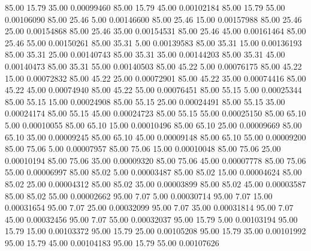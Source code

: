      85.00     15.79     35.00     0.00099460
     85.00     15.79     45.00     0.00102184
     85.00     15.79     55.00     0.00106090
     85.00     25.46      5.00     0.00146600
     85.00     25.46     15.00     0.00157988
     85.00     25.46     25.00     0.00154868
     85.00     25.46     35.00     0.00154531
     85.00     25.46     45.00     0.00161464
     85.00     25.46     55.00     0.00150261
     85.00     35.31      5.00     0.00139583
     85.00     35.31     15.00     0.00136193
     85.00     35.31     25.00     0.00140743
     85.00     35.31     35.00     0.00144203
     85.00     35.31     45.00     0.00140473
     85.00     35.31     55.00     0.00140503
     85.00     45.22      5.00     0.00076175
     85.00     45.22     15.00     0.00072832
     85.00     45.22     25.00     0.00072901
     85.00     45.22     35.00     0.00074416
     85.00     45.22     45.00     0.00074940
     85.00     45.22     55.00     0.00076451
     85.00     55.15      5.00     0.00025344
     85.00     55.15     15.00     0.00024908
     85.00     55.15     25.00     0.00024491
     85.00     55.15     35.00     0.00024174
     85.00     55.15     45.00     0.00024723
     85.00     55.15     55.00     0.00025150
     85.00     65.10      5.00     0.00010055
     85.00     65.10     15.00     0.00010496
     85.00     65.10     25.00     0.00009669
     85.00     65.10     35.00     0.00009245
     85.00     65.10     45.00     0.00009148
     85.00     65.10     55.00     0.00009200
     85.00     75.06      5.00     0.00007957
     85.00     75.06     15.00     0.00010048
     85.00     75.06     25.00     0.00010194
     85.00     75.06     35.00     0.00009320
     85.00     75.06     45.00     0.00007778
     85.00     75.06     55.00     0.00006997
     85.00     85.02      5.00     0.00003487
     85.00     85.02     15.00     0.00004624
     85.00     85.02     25.00     0.00004312
     85.00     85.02     35.00     0.00003899
     85.00     85.02     45.00     0.00003587
     85.00     85.02     55.00     0.00002662
     95.00      7.07      5.00     0.00030714
     95.00      7.07     15.00     0.00031654
     95.00      7.07     25.00     0.00032099
     95.00      7.07     35.00     0.00031814
     95.00      7.07     45.00     0.00032456
     95.00      7.07     55.00     0.00032037
     95.00     15.79      5.00     0.00103194
     95.00     15.79     15.00     0.00103372
     95.00     15.79     25.00     0.00105208
     95.00     15.79     35.00     0.00101992
     95.00     15.79     45.00     0.00104183
     95.00     15.79     55.00     0.00107626
